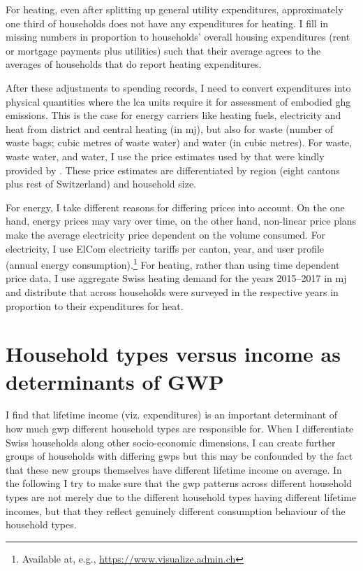 \documentclass[referee, lineno, pdflatex,sn-apa]{sn-jnl}%
\theoremstyle{thmstyleone}%
\theoremstyle{thmstyletwo}%
\theoremstyle{thmstylethree}%
\begin{document}
\begin{appendices}
For heating, even after splitting up general utility expenditures, approximately one third of households does not have any expenditures for heating.
I fill in missing numbers in proportion to households' overall housing expenditures (rent or mortgage payments plus utilities) such that their average agrees to the averages of households that do report heating expenditures.

After these adjustments to spending records, I need to convert expenditures into physical quantities where the \ac{lca} units require it for assessment of embodied \ac{ghg} emissions.
This is the case for energy carriers like heating fuels, electricity and heat from district and central heating (in \ac{mj}), but also for waste (number of waste bags; cubic metres of waste water) and water (in cubic metres).
For waste, waste water, and water, I use the price estimates used by \citet{froemelt_using_2018} that were kindly provided by \citeauthor{jakobs_nfp73_2023}.
These price estimates are differentiated by region (eight cantons plus rest of Switzerland) and household size.

For energy, I take different reasons for differing prices into account.
On the one hand, energy prices may vary over time, on the other hand, non-linear price plans make the average electricity price dependent on the volume consumed.
For electricity, I use ElCom electricity tariffs per canton, year, and user profile (annual energy consumption).\footnote{Available at, e.g., \url{https://www.visualize.admin.ch}}
For heating, rather than using time dependent price data, I use aggregate Swiss heating demand for the years 2015--2017 in \ac{mj} and distribute that across households were surveyed in the respective years in proportion to their expenditures for heat.



\clearpage

\section{Household types versus income as determinants of GWP}
\label{app:cross}

I find that lifetime income (viz. expenditures) is an important determinant of how much \ac{gwp} different household types are responsible for.
When I differentiate Swiss households along other socio-economic dimensions, I can create further groups of households with differing \acp{gwp} but this may be confounded by the fact that these new groups themselves have different lifetime income on average.
In the following I try to make sure that the \ac{gwp} patterns across different household types are not merely due to the different household types having different lifetime incomes, but that they reflect genuinely different consumption behaviour of the household types.


\end{appendices}
\end{document}
